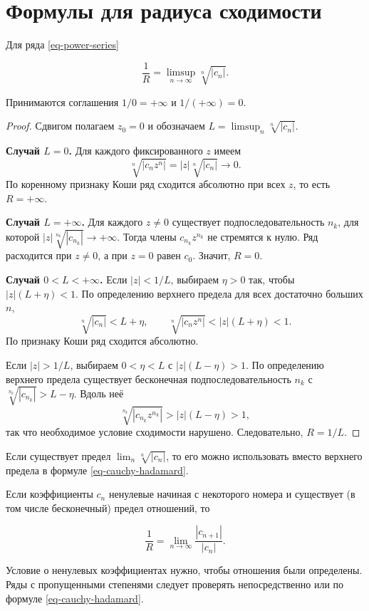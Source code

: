\section{Формулы для радиуса сходимости}\label{sec-power-series-02}

\begin{theorem}\label{thm-cauchy-hadamard}

Для ряда \eqref{eq-power-series}

\begin{equation}
\frac1R=\limsup_{n\to\infty}\sqrt[n]{|c_n|}.
\label{eq-cauchy-hadamard}
\end{equation}

Принимаются соглашения \(1/0=+\infty\) и \(1/(+\infty)=0\).

\end{theorem}

\begin{proof}

Сдвигом полагаем \(z_0=0\) и обозначаем \(L=\limsup_n\sqrt[n]{|c_n|}\).

\textbf{Случай \(L=0\).} Для каждого фиксированного \(z\) имеем \[
\sqrt[n]{|c_nz^n|}=|z|\sqrt[n]{|c_n|}\longrightarrow0.
\] По коренному признаку Коши ряд сходится абсолютно при всех \(z\), то есть \(R=+\infty\).

\textbf{Случай \(L=+\infty\).} Для каждого \(z\ne0\) существует подпоследовательность \(n_k\), для которой \(|z|\sqrt[n_k]{|c_{n_k}|}\to+\infty\). Тогда члены \(c_{n_k}z^{n_k}\) не стремятся к нулю. Ряд расходится при \(z\ne0\), а при \(z=0\) равен \(c_0\). Значит, \(R=0\).

\textbf{Случай \(0<L<+\infty\).} Если \(|z|<1/L\), выбираем \(\eta>0\) так, чтобы \(|z|(L+\eta)<1\). По определению верхнего предела для всех достаточно больших \(n\), \[
\sqrt[n]{|c_n|}<L+\eta,
\qquad\sqrt[n]{|c_nz^n|}<|z|(L+\eta)<1.
\] По признаку Коши ряд сходится абсолютно.

Если \(|z|>1/L\), выбираем \(0<\eta<L\) с \(|z|(L-\eta)>1\). По определению верхнего предела существует бесконечная подпоследовательность \(n_k\) с \(\sqrt[n_k]{|c_{n_k}|}>L-\eta\). Вдоль неё \[
\sqrt[n_k]{|c_{n_k}z^{n_k}|}>|z|(L-\eta)>1,
\] так что необходимое условие сходимости нарушено. Следовательно, \(R=1/L\).

\end{proof}

\begin{cor}\label{cor-radius-limits}

Если существует предел \(\lim_n\sqrt[n]{|c_n|}\), то его можно использовать вместо верхнего предела в формуле \eqref{eq-cauchy-hadamard}.

Если коэффициенты \(c_n\) ненулевые начиная с некоторого номера и существует (в том числе бесконечный) предел отношений, то

\begin{equation}
\frac1R=\lim_{n\to\infty}\frac{|c_{n+1}|}{|c_n|}.
\label{eq-radius-ratio}
\end{equation}

\end{cor}

Условие о ненулевых коэффициентах нужно, чтобы отношения были определены. Ряды с пропущенными степенями следует проверять непосредственно или по формуле \eqref{eq-cauchy-hadamard}.
